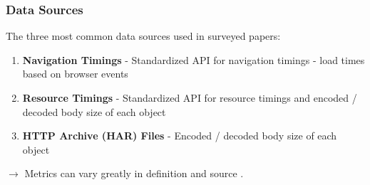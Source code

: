 \begin{frame}
    \frametitle{Data Sources}
    The three most common data sources used in surveyed papers:
	\begin{enumerate}
	  \item \textbf{Navigation Timings} - Standardized API for navigation timings - load times based on browser events \cite{timing_2012}
	  \item \textbf{Resource Timings} -  Standardized API for resource timings and encoded / decoded body size of each object \cite{w3c_2020}
	  \item \textbf{HTTP Archive (HAR) Files} -  Encoded / decoded body size of each object \cite{har_format_2012}
	\end{enumerate}
	 $\boldsymbol{\rightarrow}$ Metrics can vary greatly in definition and source \cite{10.1007/978-3-030-15986-3_19}.
\end{frame}